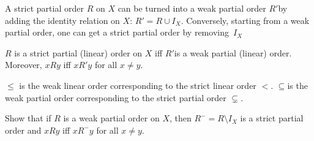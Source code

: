 \documentclass[open-logic-section]{subfiles}
\begin{document}
A strict partial order $R$ on $X$ can be turned into a weak partial
order $R'$by adding the identity relation on $X$: $R'=R\cup I_{X}$.
Conversely, starting from a weak partial order, one can get a strict
partial order by removing~$I_{X}$

\begin{prop}
$R$ is a strict partial (linear) order on $X$ iff $R'$is a weak
  partial (linear) order. Moreover, $xRy$ iff $xR'y$ for all $x\neq
  y$.
\end{prop}

\begin{ex}
$\le$ is the weak linear order corresponding to the strict linear
  order $<$. $\subseteq$is the weak partial order corresponding to the
  strict partial order $\subsetneq$.
\end{ex}

\begin{prob}
Show that if $R$ is a weak partial order on $X$, then
$R^{-}=R\setminus I_{X}$ is a strict partial order and $xRy$ iff
$xR^{-}y$ for all $x\neq y$.
\end{prob}
\end{document}
